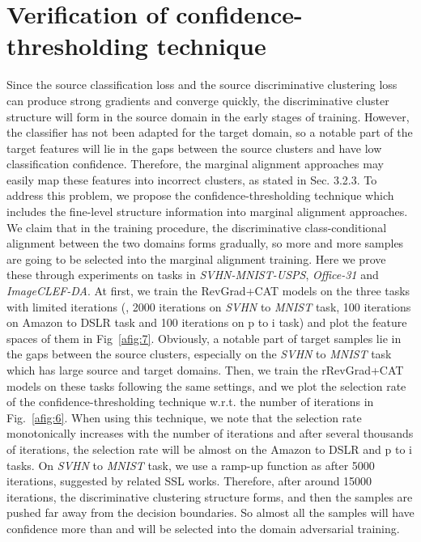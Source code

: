 \documentclass[10pt,twocolumn,letterpaper]{article}
\begin{document}
\section{Verification of confidence-thresholding technique}
Since the source classification loss and the source discriminative clustering loss can produce strong gradients and converge quickly, the discriminative cluster structure will form in the source domain in the early stages of training. However, the classifier has not been adapted for the target domain, so a notable part of the target features will lie in the gaps between the source clusters and have low classification confidence. Therefore, the marginal alignment approaches may easily map these features into incorrect clusters, as stated in Sec. 3.2.3. To address this problem, we propose the confidence-thresholding technique which includes the fine-level structure information into marginal alignment approaches. We claim that in the training procedure, the discriminative class-conditional alignment between the two domains forms gradually, so more and more samples are going to be selected into the marginal alignment training. Here we prove these through experiments on tasks in \emph{SVHN-MNIST-USPS}, \emph{Office-31} and \emph{ImageCLEF-DA}. At first, we train the RevGrad+CAT models on the three tasks with limited iterations (\ie, 2000 iterations on \emph{SVHN} to \emph{MNIST} task, 100 iterations on Amazon to DSLR task and 100 iterations on p to i task) and plot the feature spaces of them in Fig~\ref{afig:7}. Obviously, a notable part of target samples lie in the gaps between the source clusters, especially on the \emph{SVHN} to \emph{MNIST} task which has large source and target domains. Then, we train the rRevGrad+CAT models on these tasks following the same settings, and we plot the selection rate of the confidence-thresholding technique w.r.t. the number of iterations in Fig.~\ref{afig:6}. When using this technique, we note that the selection rate monotonically increases with the number of iterations and after several thousands of iterations, the selection rate will be almost  on the Amazon to DSLR and p to i tasks. On \emph{SVHN} to \emph{MNIST} task, we use a ramp-up function  as  after 5000 iterations, suggested by related SSL works. Therefore, after around 15000 iterations, the discriminative clustering structure forms, and then the samples are pushed far away from the decision boundaries. So almost all the samples will have confidence more than  and will be selected into the domain adversarial training.
\end{document}
